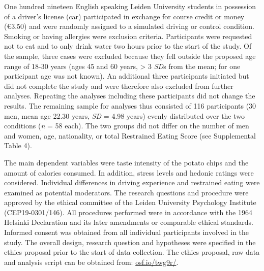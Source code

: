 \documentclass[authordate, empirical, issue]{jote-new-article}
\begin{document}
One hundred nineteen English speaking Leiden University students in possession of a driver’s license (car) participated in exchange for course credit or money (€3.50) and were randomly assigned to a simulated driving or control condition. Smoking or having allergies were exclusion criteria. Participants were requested not to eat and to only drink water two hours prior to the start of the study. Of the sample, three cases were excluded because they fell outside the proposed age range of 18-30 years (ages 45 and 60 years, > 3 \emph{SD}s from the mean; for one participant age was not known). An additional three participants initiated but did not complete the study and were therefore also excluded from further analyses. Repeating the analyses including these participants did not change the results. The remaining sample for analyses thus consisted of 116 participants (30 men, mean age 22.30 years, \emph{SD }= 4.98 years) evenly distributed over the two conditions (\emph{n }= 58 each). The two groups did not differ on the number of men and women, age, nationality, or total Restrained Eating Score (see Supplemental Table 4).



The main dependent variables were taste intensity of the potato chips and the amount of calories consumed. In addition, stress levels and hedonic ratings were considered. Individual differences in driving experience and restrained eating were examined as potential moderators. The research questions and procedure were approved by the ethical committee of the Leiden University Psychology Institute (CEP19-0301/146). All procedures performed were in accordance with the 1964 Helsinki Declaration and its later amendments or comparable ethical standards. Informed consent was obtained from all individual participants involved in the study. The overall design, research question and hypotheses were specified in the ethics proposal prior to the start of data collection. The ethics proposal, raw data and analysis script can be obtained from: \href{https://osf.io/twg9r/}{osf.io/twg9r/}.
\end{document}
